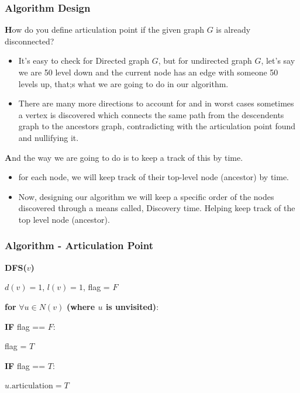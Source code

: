\begin{frame}
    \frametitle{Algorithm Design}
        \textbf How do you define articulation point if the given graph $G$ is already disconnected? 
    \begin{itemize}
        \item It's easy to check for Directed graph $G$, but for undirected graph $G$, let's say we are 50 level down and the current node has an edge with someone 50 levels up, that;s what we are going to do in our algorithm. 
        \item There are many more directions to account for and in worst cases sometimes a vertex is discovered which connects the same path from the descendents graph to the ancestors graph, contradicting with the articulation point found and nullifying it.
    \end{itemize}
    \vspace*{5pt}
    \textbf And the way we are going to do is to keep a track of this by time. 
    \begin{itemize}
        \item for each node, we will keep track of their top-level node (ancestor) by time. 
        \item Now, designing our algorithm we will keep a specific order of the nodes discovered through a means called, Discovery time. Helping keep track of the top level node (ancestor).
    \end{itemize}
\end{frame}

\begin{frame}
    \frametitle{Algorithm - Articulation Point}

    \textbf{DFS(\( v \))}

    \vspace{10pt}
    
    \hspace{10pt} \( d(v) = 1 \), \( l(v) = 1 \), flag = \( F \)

    \vspace{10pt}

    \hspace{10pt} \textbf{for} \( \forall u \in N(v) \) \textbf{(where \( u \) is unvisited)}:
    
    \vspace{10pt}
    
    \hspace{20pt} \textbf{\textbf{}{IF}} flag == \( F \):
    
    \vspace{10pt}
    
    \hspace{30pt} flag = \( T \)
    
    \vspace{10pt}
    
    \hspace{20pt} \textbf{\textbf{}{IF}} flag == \( T \):
    
    \vspace{10pt}
    
    \hspace{30pt} \( u.\text{articulation} = T \)
\end{frame}

